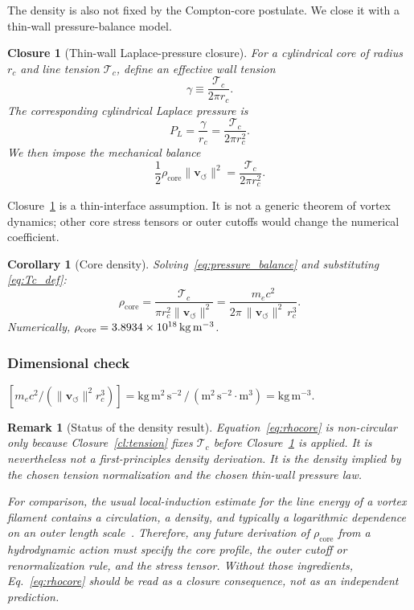 \documentclass[aps,pra,preprint,longbibliography,nofootinbib]{revtex4-2}
\newtheorem{corollary}{Corollary}
\newtheorem{remark}{Remark}
\newtheorem{closure}{Closure}
\newcommand{\vnorm}{\lVert\mathbf{v}_{\!\boldsymbol{\circlearrowleft}}\rVert} %
\newcommand{\rhocore}{\rho_{\mathrm{core}}}      %
\newcommand{\rc}{r_c}                            %
\newcommand{\Tc}{\mathcal{T}_c}                  %
\begin{document}
The density is also not fixed by the Compton-core postulate.  We close
it with a thin-wall pressure-balance model.

\begin{closure}[Thin-wall Laplace-pressure closure]
\label{cl:laplace}
For a cylindrical core of radius $\rc$ and line tension $\Tc$, define an
effective wall tension
\begin{equation}
  \gamma \equiv \frac{\Tc}{2\pi\rc}.
  \label{eq:wall_tension}
\end{equation}
The corresponding cylindrical Laplace pressure is
\begin{equation}
  P_L = \frac{\gamma}{\rc} = \frac{\Tc}{2\pi\rc^2}.
  \label{eq:Laplace}
\end{equation}
We then impose the mechanical balance
\begin{equation}
  \frac{1}{2}\rhocore\vnorm^2 = \frac{\Tc}{2\pi\rc^2}.
  \label{eq:pressure_balance}
\end{equation}
\end{closure}

Closure~\ref{cl:laplace} is a thin-interface assumption.  It is not a
generic theorem of vortex dynamics; other core stress tensors or outer
cutoffs would change the numerical coefficient.

\begin{corollary}[Core density]
\label{cor:rho}
Solving~\eqref{eq:pressure_balance} and substituting
\eqref{eq:Tc_def}:
\begin{equation}
  \boxed{
    \rhocore = \frac{\Tc}{\pi\rc^2\vnorm^2}
             = \frac{m_e c^2}{2\pi\,\vnorm^2\,\rc^3}.
  }
  \label{eq:rhocore}
\end{equation}
Numerically, $\rhocore = \SI{3.893\,4e18}{\kilogram\per\cubic\meter}$.
\end{corollary}

\subsubsection*{Dimensional check}
$[m_e c^2/(\vnorm^2\rc^3)]
= \mathrm{kg\,m^2\,s^{-2}\,/\,(m^2\,s^{-2}\cdot m^3)}
= \mathrm{kg\,m^{-3}}$. \checkmark

\begin{remark}[Status of the density result]
\label{rem:noncircular}
Equation~\eqref{eq:rhocore} is non-circular only because
Closure~\ref{cl:tension} fixes $\Tc$ before Closure~\ref{cl:laplace} is
applied.  It is nevertheless not a first-principles density derivation.
It is the density implied by the chosen tension normalization and the
chosen thin-wall pressure law.

For comparison, the usual local-induction estimate for the line energy
of a vortex filament contains a circulation, a density, and typically a
logarithmic dependence on an outer length scale~\cite{Saffman1992}.
Therefore, any future derivation of $\rhocore$ from a hydrodynamic action
must specify the core profile, the outer cutoff or renormalization rule,
and the stress tensor.  Without those ingredients, Eq.~\eqref{eq:rhocore}
should be read as a closure consequence, not as an independent prediction.
\end{remark}
\end{document}
